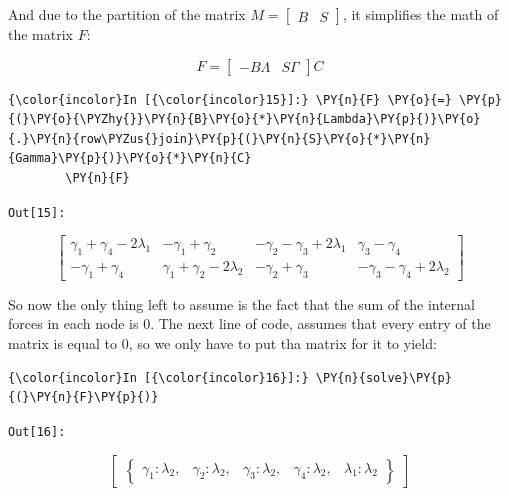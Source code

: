 And due to the partition of the matrix
\(M = \begin{bmatrix} B & S \end{bmatrix}\), it simplifies the math of
the matrix \(F\):

\[
F =
\begin{bmatrix}
    -B \Lambda & S \Gamma
    \end{bmatrix} C
    \]

    \begin{Verbatim}[commandchars=\\\{\}]
        {\color{incolor}In [{\color{incolor}15}]:} \PY{n}{F} \PY{o}{=} \PY{p}{(}\PY{o}{\PYZhy{}}\PY{n}{B}\PY{o}{*}\PY{n}{Lambda}\PY{p}{)}\PY{o}{.}\PY{n}{row\PYZus{}join}\PY{p}{(}\PY{n}{S}\PY{o}{*}\PY{n}{Gamma}\PY{p}{)}\PY{o}{*}\PY{n}{C}
        \PY{n}{F}
    \end{Verbatim}
    \texttt{\color{outcolor}Out[{\color{outcolor}15}]:}


    \begin{equation*}
        \left[\begin{matrix}\gamma_{1} + \gamma_{4} - 2 \lambda_{1} & - \gamma_{1} + \gamma_{2} & - \gamma_{2} - \gamma_{3} + 2 \lambda_{1} & \gamma_{3} - \gamma_{4}\\- \gamma_{1} + \gamma_{4} & \gamma_{1} + \gamma_{2} - 2 \lambda_{2} & - \gamma_{2} + \gamma_{3} & - \gamma_{3} - \gamma_{4} + 2 \lambda_{2}\end{matrix}\right]
    \end{equation*}



    So now the only thing left to assume is the fact that the sum of the
    internal forces in each node is \(0\). The next line of code, assumes
    that every entry of the matrix is equal to \(0\), so we only have to put
    tha matrix for it to yield:

    \begin{Verbatim}[commandchars=\\\{\}]
        {\color{incolor}In [{\color{incolor}16}]:} \PY{n}{solve}\PY{p}{(}\PY{n}{F}\PY{p}{)}
    \end{Verbatim}
    \texttt{\color{outcolor}Out[{\color{outcolor}16}]:}


    \begin{equation*}
        \begin{bmatrix}\begin{Bmatrix}\gamma_{1} : \lambda_{2}, & \gamma_{2} : \lambda_{2}, & \gamma_{3} : \lambda_{2}, & \gamma_{4} : \lambda_{2}, & \lambda_{1} : \lambda_{2}\end{Bmatrix}\end{bmatrix}
        \end{equation*}



